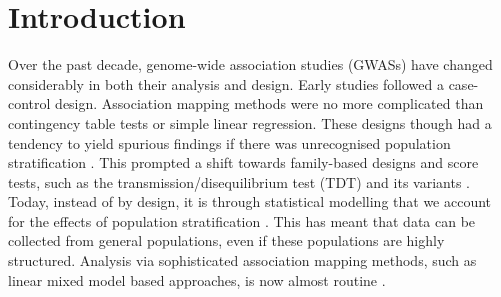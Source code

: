 \documentclass{bioinfo}
\begin{document}
\maketitle

\section{Introduction}


Over the past decade,  genome-wide association studies (GWASs) have changed considerably in both their analysis and design. Early studies
 followed a case-control design. Association mapping methods were no more complicated than contingency table tests or simple 
linear regression. These designs though had a tendency to yield spurious findings if there was unrecognised population stratification 
\citep{cardon2003population}. This prompted a shift towards family-based designs and score tests, such as the transmission/disequilibrium test (TDT)  and its variants \citep{spielman1996tdt}. Today, instead of by design, it is through statistical modelling that we account for the effects of population stratification \citep{price2010new}. This has meant that data can be collected from general populations, even if these populations are highly structured. Analysis via sophisticated association mapping methods, such as linear mixed model based approaches,  is now almost routine  \citep{yu2006unified,zhao2007arabidopsis}.
\end{document}

